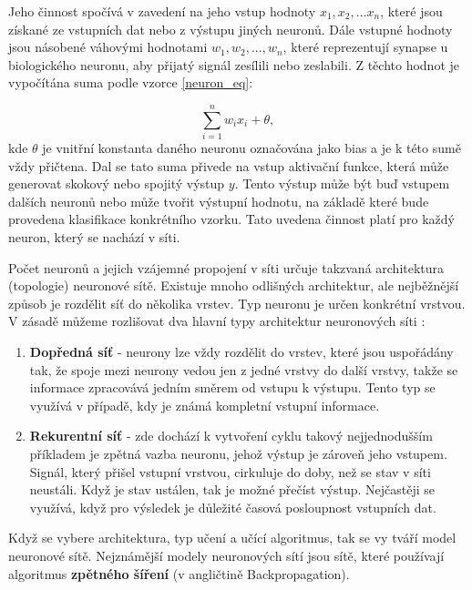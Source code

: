 Jeho činnost spočívá v zavedení na jeho vstup hodnoty $x_1,x_2,...x_n$, které jsou získané ze vstupních dat nebo z výstupu jiných neuronů. Dále vstupné hodnoty jsou násobené váhovými hodnotami $w_1,w_2,...,w_n$, které reprezentují synapse u biologického neuronu, aby přijatý signál zesílili nebo zeslabili. Z těchto hodnot je vypočítána suma podle vzorce \ref{neuron_eq}:

    \begin{equation}
	    \sum_{i=1}^n w_ix_i + \theta,
	    \label{neuron_eq}
    \end{equation}
kde $\theta$ je vnitřní konstanta daného neuronu označována jako bias a je k této sumě vždy přičtena. Dal se tato suma přivede  na vstup aktivační funkce, která může generovat skokový nebo spojitý výstup $y$. Tento výstup může být buď vstupem dalších neuronů nebo může tvořit výstupní hodnotu, na základě které bude provedena klasifikace konkrétního vzorku. Tato uvedena činnost platí pro každý neuron, který se nachází v síti. \cite{Han}

Počet neuronů a jejich vzájemné propojení v síti určuje takzvaná architektura (topologie) neuronové sítě. Existuje mnoho odlišných architektur, ale nejběžnější způsob je rozdělit síť do několika vrstev. Typ neuronu je určen konkrétní vrstvou. V zásadě můžeme rozlišovat dva hlavní typy architektur neuronových síti \cite{Dunham}:

\begin{enumerate}
    \item \textbf{Dopředná síť} - neurony lze vždy rozdělit do vrstev, které jsou uspořádány tak, že spoje mezi neurony vedou jen z jedné vrstvy do další vrstvy, takže se informace zpracovává jedním směrem od vstupu k výstupu. Tento typ se využívá v případě, kdy je známá kompletní vstupní informace.
    \item \textbf{Rekurentní síť } - zde dochází k vytvoření cyklu takový nejjednodušším příkladem je zpětná vazba neuronu, jehož výstup je zároveň jeho vstupem. Signál, který přišel vstupní vrstvou, cirkuluje do doby, než se stav v síti neustáli. Když je stav ustálen, tak je možné přečíst výstup. Nejčastěji se využívá, když pro výsledek je důležité časová posloupnost vstupních dat.
\end{enumerate}

Když se vybere architektura, typ učení a učící algoritmus, tak se vy tváří model neuronové sítě. Nejznámější modely neuronových sítí jsou sítě, které používají algoritmus \textbf{zpětného šíření} (v angličtině Backpropagation). 

